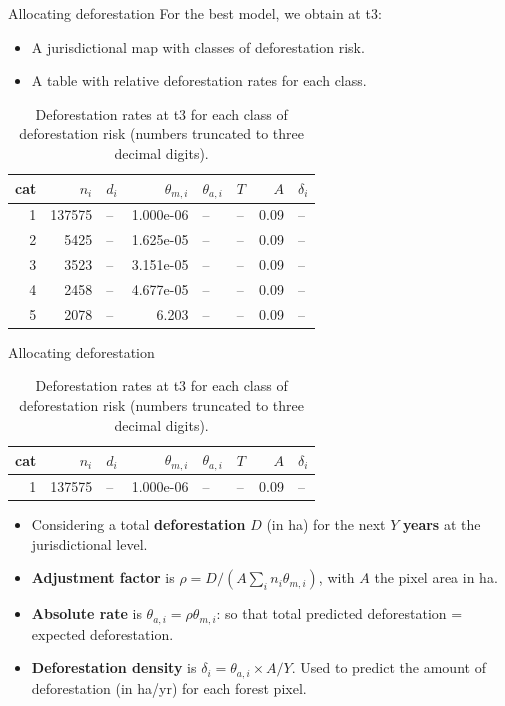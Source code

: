 \documentclass[10pt,table,dvipsnames,compress]{beamer}
\begin{document}
\begin{frame}[label={sec:orgff8474c}]{Allocating deforestation}
For the best model, we obtain at t3:
\begin{itemize}
\item A jurisdictional map with classes of deforestation risk.
\item A table with relative deforestation rates for each class.
\end{itemize}

\begin{table}[htbp]
\caption{\label{tab-defrate}Deforestation rates at t3 for each class of deforestation risk (numbers truncated to three decimal digits).}
\small
\begin{tabular}{rrlrllrl}
\toprule
cat & \(n_i\) & \(d_i\) & \(\theta_{m,i}\) & \(\theta_{a,i}\) & \(T\) & \(A\) & \(\delta_{i}\)\\[0pt]
\midrule
1 & 137575 & -- & 1.000e-06 & -- & -- & 0.09 & --\\[0pt]
2 & 5425 & -- & 1.625e-05 & -- & -- & 0.09 & --\\[0pt]
3 & 3523 & -- & 3.151e-05 & -- & -- & 0.09 & --\\[0pt]
4 & 2458 & -- & 4.677e-05 & -- & -- & 0.09 & --\\[0pt]
5 & 2078 & -- & 6.203 & -- & -- & 0.09 & --\\[0pt]
\bottomrule
\end{tabular}
\end{table}
\end{frame}

\begin{frame}[label={sec:org6aa68e5}]{Allocating deforestation}
\begin{table}[htbp]
\caption{\label{tab-defrate-header}Deforestation rates at t3 for each class of deforestation risk (numbers truncated to three decimal digits).}
\small
\begin{tabular}{rrlrllrl}
\toprule
cat & \(n_i\) & \(d_i\) & \(\theta_{m,i}\) & \(\theta_{a,i}\) & \(T\) & \(A\) & \(\delta_{i}\)\\[0pt]
\midrule
1 & 137575 & -- & 1.000e-06 & -- & -- & 0.09 & --\\[0pt]
\bottomrule
\end{tabular}
\end{table}

\begin{itemize}
\item Considering a total \textbf{deforestation} \(D\) (in ha) for the next \(Y\) \textbf{years} at the jurisdictional level.
\item \textbf{Adjustment factor} is \(\rho = D / (A \sum_i n_{i} \theta_{m,i})\), with \(A\) the pixel area in ha.
\item \textbf{Absolute rate} is \(\theta_{a,i} = \rho \theta_{m,i}\): so that total predicted deforestation = expected deforestation.
\item \textbf{Deforestation density} is \(\delta_{i} = \theta_{a,i} \times A / Y\). Used to predict the amount of deforestation (in ha/yr) for each forest pixel.
\end{itemize}
\end{frame}
\end{document}
